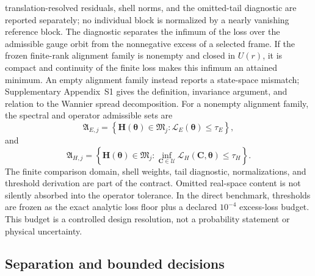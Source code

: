 \documentclass[preprint,12pt]{elsarticle}
\begin{document}
translation-resolved residuals, shell norms, and the omitted-tail diagnostic
are reported separately; no individual block is normalized by a nearly
vanishing reference block. The diagnostic separates the infimum of the loss over
the admissible gauge orbit from the nonnegative excess of a selected frame. If
the frozen finite-rank alignment family is nonempty and closed in $U(r)$, it is
compact and continuity of the finite loss makes this infimum an attained
minimum. An empty alignment family instead reports a state-space mismatch;
Supplementary
Appendix~S1 gives the definition, invariance argument, and relation to the
Wannier spread decomposition. For a nonempty alignment family, the spectral
and operator admissible sets are
\begin{equation}
 \mathfrak{A}_{E,j}
 =\left\{
 \bm{H}(\bm{\theta})\in\mathfrak{M}_j:
 \mathcal{L}_E(\bm{\theta})\leq\tau_E
 \right\},
 \label{eq:spectral-set}
\end{equation}
and
\begin{equation}
 \mathfrak{A}_{H,j}
 =\left\{
 \bm{H}(\bm{\theta})\in\mathfrak{M}_j:
 \inf_{\bm{C}\in\mathcal{U}}
 \mathcal{L}_H(\bm{C},\bm{\theta})\leq\tau_H
 \right\}.
 \label{eq:operator-set}
\end{equation}
The finite comparison domain, shell weights, tail diagnostic, normalizations,
and threshold derivation are part of the contract. Omitted real-space content
is not silently absorbed into the operator tolerance. In the direct benchmark,
thresholds are frozen as the exact analytic loss floor plus a declared
$10^{-4}$ excess-loss budget. This budget is a controlled design resolution,
not a probability statement or physical uncertainty.

\subsection{Separation and bounded decisions}
\label{sec:bounded-decisions}
\end{document}
